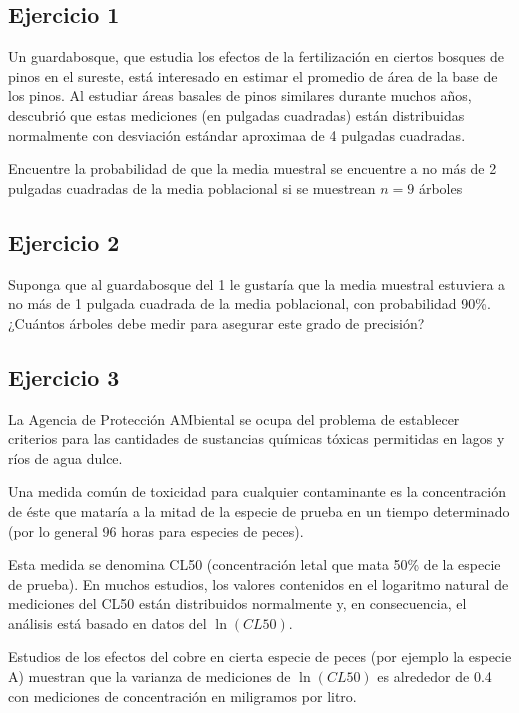 \documentclass[
]{article}
\begin{document}
\subsection{Ejercicio 1}\label{ejercicio-1-1}

Un guardabosque, que estudia los efectos de la fertilización en ciertos bosques de pinos en el sureste, está interesado en estimar el promedio de área de la base de los pinos. Al estudiar áreas basales de pinos similares durante muchos años, descubrió que estas mediciones (en pulgadas cuadradas) están distribuidas normalmente con desviación estándar aproximaa de 4 pulgadas cuadradas.

Encuentre la probabilidad de que la media muestral se encuentre a no más de 2 pulgadas cuadradas de la media poblacional si se muestrean \(n=9\) árboles

\subsection{Ejercicio 2}\label{ejercicio-2-1}

Suponga que al guardabosque del 1 le gustaría que la media muestral estuviera a no más de 1 pulgada cuadrada de la media poblacional, con probabilidad 90\%. ¿Cuántos árboles debe medir para asegurar este grado de precisión?

\subsection{Ejercicio 3}\label{ejercicio-3-1}

La Agencia de Protección AMbiental se ocupa del problema de establecer criterios para las cantidades de sustancias químicas tóxicas permitidas en lagos y ríos de agua dulce.

Una medida común de toxicidad para cualquier contaminante es la concentración de éste que mataría a la mitad de la especie de prueba en un tiempo determinado (por lo general 96 horas para especies de peces).

Esta medida se denomina CL50 (concentración letal que mata 50\% de la especie de prueba). En muchos estudios, los valores contenidos en el logaritmo natural de mediciones del CL50 están distribuidos normalmente y, en consecuencia, el análisis está basado en datos del \(\ln(CL50)\).

Estudios de los efectos del cobre en cierta especie de peces (por ejemplo la especie A) muestran que la varianza de mediciones de \(\ln(CL50)\) es alrededor de 0.4 con mediciones de concentración en miligramos por litro.
\end{document}
